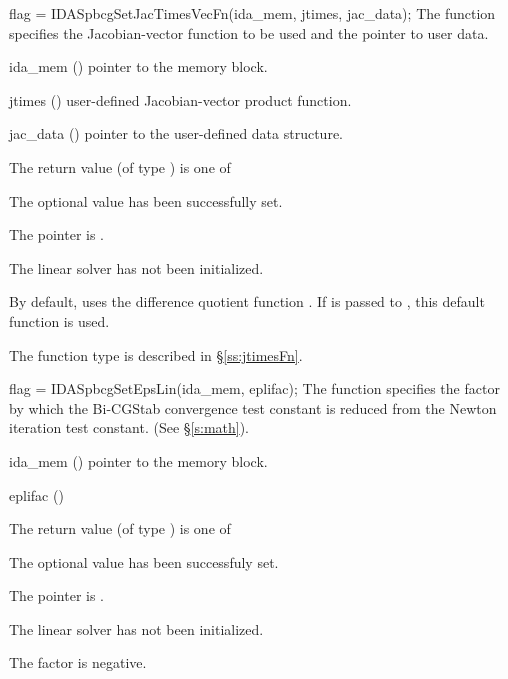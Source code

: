 {
  flag = IDASpbcgSetJacTimesVecFn(ida\_mem, jtimes, jac\_data);
}
{
  The function  specifies the Jacobian-vector 
  function to be used and the pointer to user data.
}
{
  \begin{args}
  \item[ida\_mem] ()
    pointer to the {\ida} memory block.
  \item[jtimes] ()
    user-defined Jacobian-vector product function.
  \item[jac\_data] ()
     pointer to the user-defined data structure.
  \end{args}
}
{
  The return value  (of type ) is one of
  \begin{args}
  \item[\Id{IDASPBCG\_SUCCESS}] 
    The optional value has been successfully set.
  \item[\Id{IDASPBCG\_MEM\_NULL}]
    The  pointer is .
  \item[\Id{IDASPBCG\_LMEM\_NULL}]
    The {\idaspgmr} linear solver has not been initialized.
  \end{args}
}
{
  By default, {\idaspbcg} uses the difference quotient function .
  If  is passed to , this default function is used.

  The function type  is described in \S\ref{ss:jtimesFn}.
}
{
  flag = IDASpbcgSetEpsLin(ida\_mem, eplifac);
}
{
  The function  specifies the factor by
  which the Bi-CGStab convergence test constant is reduced
  from the Newton iteration test constant. (See \S\ref{s:math}).
}
{
  \begin{args}
  \item[ida\_mem] ()
    pointer to the {\ida} memory block.
  \item[eplifac] ()

  \end{args}
}
{
  The return value  (of type ) is one of
  \begin{args}
  \item[\Id{IDASPBCG\_SUCCESS}] 
    The optional value has been successfuly set.
  \item[\Id{IDASPBCG\_MEM\_NULL}]
    The  pointer is .
  \item[\Id{IDASPBCG\_LMEM\_NULL}]
    The {\idaspgmr} linear solver has not been initialized.
  \item[\Id{IDASPBCG\_ILL\_INPUT}]
    The factor  is negative.  
  \end{args}
}
